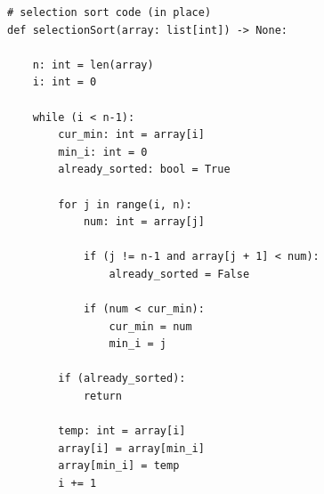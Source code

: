 \begin{verbatim}
# selection sort code (in place)
def selectionSort(array: list[int]) -> None:
    
    n: int = len(array)
    i: int = 0
    
    while (i < n-1):
        cur_min: int = array[i]
        min_i: int = 0
        already_sorted: bool = True
        
        for j in range(i, n):
            num: int = array[j]
            
            if (j != n-1 and array[j + 1] < num):
                already_sorted = False
                
            if (num < cur_min):
                cur_min = num
                min_i = j
        
        if (already_sorted):
            return
        
        temp: int = array[i]
        array[i] = array[min_i]
        array[min_i] = temp
        i += 1
\end{verbatim}



